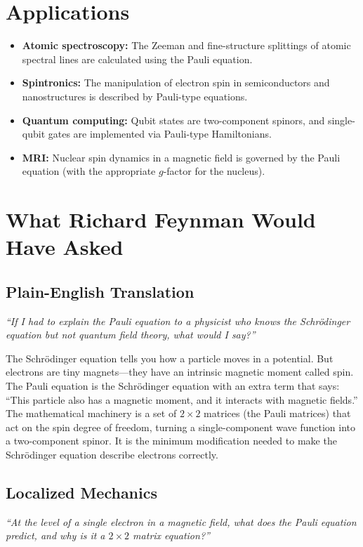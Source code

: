 \documentclass[11pt,openright]{book}
\begin{document}
\section*{Applications}

\begin{itemize}
  \item \textbf{Atomic spectroscopy:} The Zeeman and fine-structure splittings of atomic spectral lines are calculated using the Pauli equation.
  \item \textbf{Spintronics:} The manipulation of electron spin in semiconductors and nanostructures is described by Pauli-type equations.
  \item \textbf{Quantum computing:} Qubit states are two-component spinors, and single-qubit gates are implemented via Pauli-type Hamiltonians.
  \item \textbf{MRI:} Nuclear spin dynamics in a magnetic field is governed by the Pauli equation (with the appropriate $g$-factor for the nucleus).
\end{itemize}
\section*{What Richard Feynman Would Have Asked}

\subsection*{Plain-English Translation}
\textit{``If I had to explain the Pauli equation to a physicist who knows the Schrödinger equation but not quantum field theory, what would I say?''}

The Schrödinger equation tells you how a particle moves in a potential. But electrons are tiny magnets---they have an intrinsic magnetic moment called spin. The Pauli equation is the Schrödinger equation with an extra term that says: ``This particle also has a magnetic moment, and it interacts with magnetic fields.'' The mathematical machinery is a set of $2 \times 2$ matrices (the Pauli matrices) that act on the spin degree of freedom, turning a single-component wave function into a two-component spinor. It is the minimum modification needed to make the Schrödinger equation describe electrons correctly.

\subsection*{Localized Mechanics}
\textit{``At the level of a single electron in a magnetic field, what does the Pauli equation predict, and why is it a $2 \times 2$ matrix equation?''}
\end{document}
